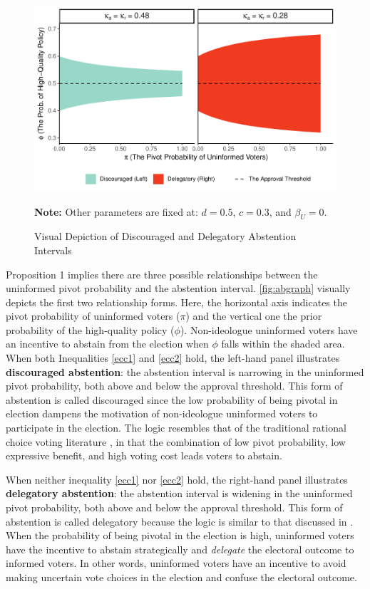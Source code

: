 \documentclass[letterpaper, 12pt]{article}
\newcommand{\floatnote}[1]{\vspace{\abovecaptionskip}\caption*{\textbf{Note:} #1}\vspace{-\abovecaptionskip}}
\begin{document}
    \begin{figure}[t!]
        \caption{Visual Depiction of Discouraged and Delegatory Abstention Intervals}
        \label{fig:abgraph}
        \includegraphics[width=\linewidth]{figure/abgraph-1}
        \floatnote{Other parameters are fixed at: $d=0.5$, $c=0.3$, and $\beta_U=0$.}
    \end{figure}
    
    \noindent Proposition 1 implies there are three possible relationships between the uninformed pivot probability and the abstention interval. \autoref{fig:abgraph} visually depicts the first two relationship forms. Here, the horizontal axis indicates the pivot probability of uninformed voters ($\pi$) and the vertical one the prior probability of the high-quality policy ($\phi$). Non-ideologue uninformed voters have an incentive to abstain from the election when $\phi$ falls within the shaded area. When both Inequalities \ref{ecc1} and \ref{ecc2} hold, the left-hand panel illustrates \textbf{discouraged abstention}: the abstention interval is narrowing in the uninformed pivot probability, both above and below the approval threshold. This form of abstention is called discouraged since the low probability of being pivotal in election dampens the motivation of non-ideologue uninformed voters to participate in the election. The logic resembles that of the traditional rational choice voting literature \citep{Downs1957anec, Riker1968thof, Matsusaka1995exvo}, in that the combination of low pivot probability, low expressive benefit, and high voting cost leads voters to abstain.
    
    \par When neither inequality \ref{ecc1} nor \ref{ecc2} hold, the right-hand panel illustrates \textbf{delegatory abstention}: the abstention interval is widening in the uninformed pivot probability, both above and below the approval threshold. This form of abstention is called delegatory because the logic is similar to that discussed in \cite{Feddersen1996thsw, Feddersen1999abin}. When the probability of being pivotal in the election is high, uninformed voters have the incentive to abstain strategically and \textit{delegate} the electoral outcome to informed voters. In other words, uninformed voters have an incentive to avoid making uncertain vote choices in the election and confuse the electoral outcome.
    
\end{document}
